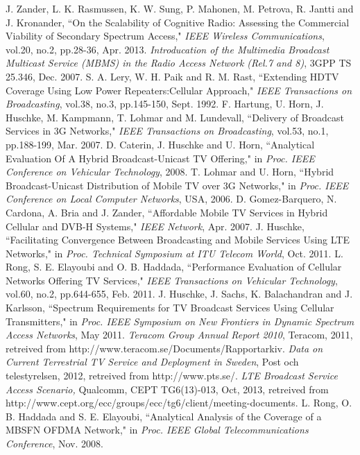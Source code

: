 \documentclass[journal]{IEEEtran}
\begin{document}
\begin{thebibliography}{40}
 J. Zander, L. K. Rasmussen, K. W. Sung, P. Mahonen, M. Petrova, R. Jantti and J. Kronander, ``On the Scalability of Cognitive Radio: Assessing the Commercial Viability of Secondary Spectrum Access," \emph{IEEE Wireless Communications}, vol.20, no.2, pp.28-36, Apr. 2013.
  \emph{Introducation of the Multimedia Broadcast Multicast Service (MBMS) in the Radio Access Network (Rel.7 and 8)}, 3GPP TS 25.346, Dec. 2007.
 S. A. Lery, W. H. Paik and R. M. Rast, ``Extending HDTV Coverage Using Low Power Repeaters:Cellular Approach," \emph{IEEE Transactions on Broadcasting}, vol.38, no.3, pp.145-150, Sept. 1992.
 F. Hartung, U. Horn, J. Huschke, M. Kampmann, T. Lohmar and M. Lundevall, ``Delivery of Broadcast Services in 3G Networks," \emph{IEEE Transactions on Broadcasting}, vol.53, no.1, pp.188-199, Mar. 2007.
     D. Caterin, J. Huschke and U. Horn, ``Analytical Evaluation Of A Hybrid Broadcast-Unicast TV Offering," in \emph{Proc. IEEE Conference on Vehicular Technology}, 2008.
 T. Lohmar and U. Horn, ``Hybrid Broadcast-Unicast Distribution of Mobile TV over 3G Networks," in \emph{Proc. IEEE Conference on Local Computer Networks}, USA, 2006.
 D. Gomez-Barquero, N. Cardona, A. Bria and J. Zander, ``Affordable Mobile TV Services in Hybrid Cellular and DVB-H Systems," \emph{IEEE Network}, Apr. 2007.
 J. Huschke, ``Facilitating Convergence Between Broadcasting and Mobile Services Using LTE Networks," in \emph{Proc. Technical Symposium at ITU Telecom World}, Oct. 2011.
 L. Rong, S. E. Elayoubi and O. B. Haddada, ``Performance Evaluation of Cellular Networks Offering TV Services," \emph{IEEE Transactions on Vehicular Technology}, vol.60, no.2, pp.644-655, Feb. 2011.
 J. Huschke, J. Sachs, K. Balachandran and J. Karlsson, ``Spectrum Requirements for TV Broadcast Services Using Cellular Transmitters," in \emph{Proc. IEEE Symposium on New Frontiers in Dynamic Spectrum Access Networks}, May 2011.
 \emph{Teracom Group Annual Report 2010}, Teracom, 2011, retreived from http://www.teracom.se/Documents/Rapportarkiv.
 \emph{Data on Current Terrestrial TV Service and Deployment in Sweden}, Post och telestyrelsen, 2012, retreived from http://www.pts.se/.
 \emph{LTE Broadcast Service Access Scenario,} Qualcomm, CEPT TG6(13)-013, Oct, 2013, retreived from http://www.cept.org/ecc/groups/ecc/tg6/client/meeting-documents.
 L. Rong, O. B. Haddada and S. E. Elayoubi, ``Analytical Analysis of the Coverage of a MBSFN OFDMA Network," in \emph{Proc. IEEE Global Telecommunications Conference}, Nov. 2008.

\end{thebibliography}
\end{document}
